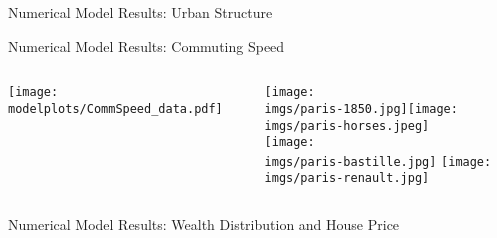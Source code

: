 \documentclass[aspectratio=169]{beamer}
\begin{document}
\begin{frame}{Numerical Model Results: Urban Structure}

	\begin{figure}[t]
		\centering
	\end{figure}
\end{frame}

\begin{frame}{Numerical Model Results: Commuting Speed}

\begin{columns}
	\begin{column}{0.5\textwidth}
		\texttt{[image: \\modelplots/CommSpeed\_data.pdf]}
	\end{column}
	\begin{column}{0.5\textwidth}
		\texttt{[image: \\imgs/paris-1850.jpg]}\texttt{[image: \\imgs/paris-horses.jpeg]}\\
		\texttt{[image: \\imgs/paris-bastille.jpg]}
		\texttt{[image: \\imgs/paris-renault.jpg]}
	\end{column}
\end{columns}
\end{frame}

\begin{frame}[label=wealthdist]{Numerical Model Results: Wealth Distribution and House Price}

	\begin{figure}[t]
		\centering
	\end{figure}
	\hyperlink{AGP}{}

\end{frame}
\end{document}
